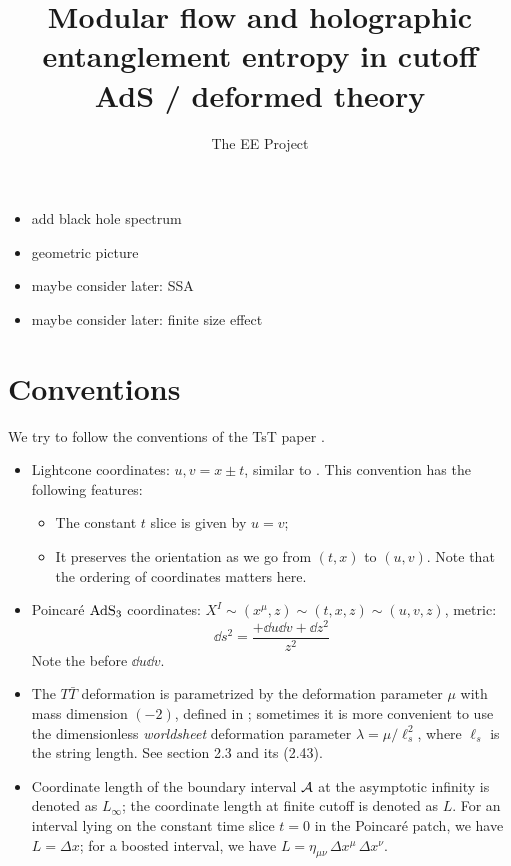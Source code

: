 \documentclass[11pt,a4paper]{article}
\title{Modular flow and holographic entanglement entropy in cutoff AdS / \TTbar deformed theory}
\author[a]{The EE \TTbar Project}
\affiliation[a]{Yau Mathematical Sciences Center, Tsinghua University, Beijing 100084, China}
\newcommand{\TTbar}{\ensuremath{T\bar{T}}\xspace}
\begin{document}
\maketitle

\setlength{\parskip}{.5\baselineskip}

\addtocounter{section}{-1}

\begin{itemize}
\item add black hole spectrum 
\item geometric picture
\item maybe consider later: SSA 
\item maybe consider later: finite size effect  
\end{itemize}


\section{Conventions}
	We try to follow the conventions of the TsT paper \textcite{Apolo:2019zai}. 
	\begin{itemize}
	\item Lightcone coordinates: $u,v = x\pm t$, similar to \cite{Apolo:2019zai}. This convention has the following features:
	
		\begin{itemize}
		\item The constant $t$ slice is given by $u = v$;
		\item It preserves the orientation as we go from $(t,x)$ to $(u,v)$. Note that the ordering of coordinates matters here.
		\end{itemize}
	
	\item Poincar\'e $\mathrm{AdS}_3$ coordinates: $
			X^I \sim (x^\mu,z) \sim (t,x,z) \sim (u,v,z)
		$, metric: 
	\begin{equation}
		\dd{s}^2
		= \frac{+\dd{u} \dd{v} + \dd{z}^2}{z^2}
	\end{equation}
	Note the \mquote{+} before $\dd{u} \dd{v}$. 
	
	\item The \TTbar deformation is parametrized by the deformation parameter $\mu$ with mass dimension $(-2)$, defined in \cite{Apolo:2019zai}; sometimes it is more convenient to use the dimensionless \textit{worldsheet} deformation parameter $\lambda = \mu/\ell_s^2$, where $\ell_s$ is the string length. See \cite{Apolo:2019zai} section 2.3 and its (2.43). 
	
	\item Coordinate length of the boundary interval $\mathcal{A}$ at the asymptotic infinity is denoted as $L_\infty$; the coordinate length at finite cutoff is denoted as $L$. For an interval lying on the constant time slice $t = 0$ in the Poincar\'e patch, we have $L = \Delta x$; for a boosted interval, we have $
		L = \eta_{\mu\nu}\, \Delta x^\mu\, \Delta x^\nu
	$. 
	\end{itemize}
	
\end{document}
